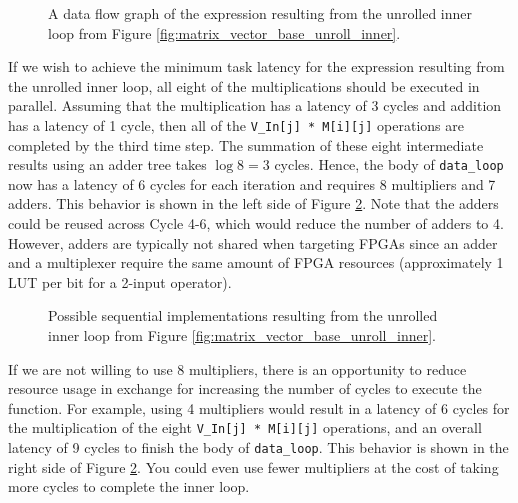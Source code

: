 \begin{figure}
\centering
\begin{tiny}

\end{tiny}
\caption{A data flow graph of the expression resulting from the unrolled inner loop from Figure \ref{fig:matrix_vector_base_unroll_inner}.}\label{fig:matrix_vector_unroll_inner_dfg}
\end{figure}

If we wish to achieve the minimum task latency for the expression resulting from the unrolled inner loop, all eight of the multiplications should be executed in parallel. Assuming that the multiplication has a latency of 3 cycles and addition has a latency of 1 cycle, then all of the \lstinline|V_In[j] * M[i][j]| operations are completed by the third time step. The summation of these eight intermediate results using an adder tree takes $\log 8 = 3$ cycles. Hence, the body of \lstinline|data_loop| now has a latency of 6 cycles for each iteration and requires 8 multipliers and 7 adders.  This behavior is shown in the left side of  Figure \ref{fig:dft_behavior1}.  Note that the adders could be reused across Cycle 4-6, which would reduce the number of adders to 4. However, adders are typically not shared when targeting FPGAs since an adder and a multiplexer require the same amount of FPGA resources (approximately 1 LUT per bit for a 2-input operator). 

\begin{figure}
\begin{tiny}
\centering

\end{tiny}
%
\caption{Possible sequential implementations resulting from the unrolled inner loop from Figure \ref{fig:matrix_vector_base_unroll_inner}.}\label{fig:dft_behavior1}
\end{figure}

If we are not willing to use 8 multipliers, there is an opportunity to reduce resource usage in exchange for increasing the number of cycles to execute the function. For example, using 4 multipliers would result in a latency of 6 cycles for the multiplication of the eight \lstinline|V_In[j] * M[i][j]| operations, and an overall latency of 9 cycles to finish the body of \lstinline|data_loop|. This behavior is shown in the right side of Figure \ref{fig:dft_behavior1}.  You could even use fewer multipliers at the cost of taking more cycles to complete the inner loop.

